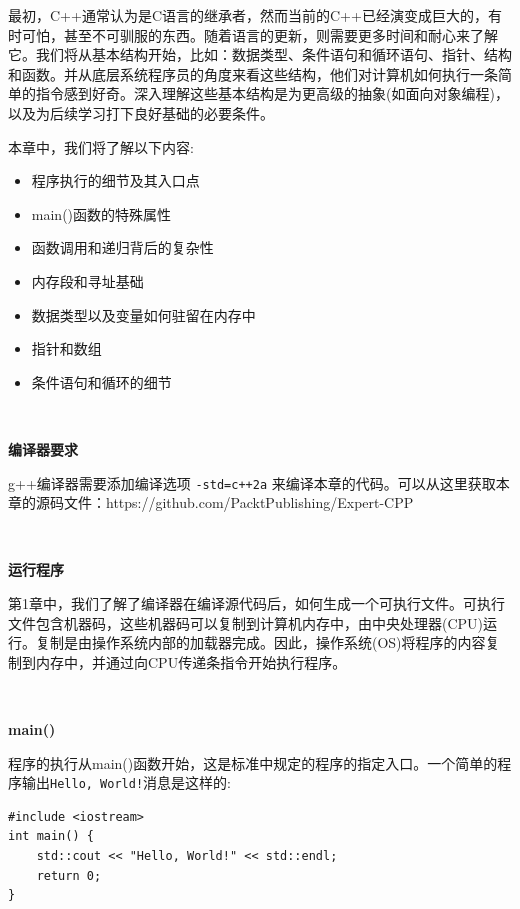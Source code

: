 最初，C++通常认为是C语言的继承者，然而当前的C++已经演变成巨大的，有时可怕，甚至不可驯服的东西。随着语言的更新，则需要更多时间和耐心来了解它。我们将从基本结构开始，比如：数据类型、条件语句和循环语句、指针、结构和函数。并从底层系统程序员的角度来看这些结构，他们对计算机如何执行一条简单的指令感到好奇。深入理解这些基本结构是为更高级的抽象(如面向对象编程)，以及为后续学习打下良好基础的必要条件。 \par
本章中，我们将了解以下内容: \par

\begin{itemize}
	\item 程序执行的细节及其入口点
	\item main()函数的特殊属性
	\item 函数调用和递归背后的复杂性
	\item 内存段和寻址基础
	\item 数据类型以及变量如何驻留在内存中
	\item 指针和数组
	\item 条件语句和循环的细节
\end{itemize}

\noindent\textbf{}\ \par
\textbf{编译器要求} \ \par
g++编译器需要添加编译选项 \texttt{-std=c++2a} 来编译本章的代码。可以从这里获取本章的源码文件：https:/​/github.​com/PacktPublishing/Expert-CPP \par

\noindent\textbf{}\ \par
\textbf{运行程序} \ \par
第1章中，我们了解了编译器在编译源代码后，如何生成一个可执行文件。可执行文件包含机器码，这些机器码可以复制到计算机内存中，由中央处理器(CPU)运行。复制是由操作系统内部的加载器完成。因此，操作系统(OS)将程序的内容复制到内存中，并通过向CPU传递条指令开始执行程序。 \par

\noindent\textbf{}\ \par
\textbf{main()} \ \par
程序的执行从main()函数开始，这是标准中规定的程序的指定入口。一个简单的程序输出\texttt{Hello, World!}消息是这样的: \par

\begin{lstlisting}[caption={}]
#include <iostream>
int main() {
	std::cout << "Hello, World!" << std::endl;
	return 0;
}	
\end{lstlisting}

